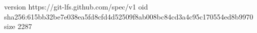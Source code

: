 version https://git-lfs.github.com/spec/v1
oid sha256:615bb32be7e038ea5fd8cfd4d52509f8ab008bc84cd3a4c95c170554ed8b9970
size 2287

